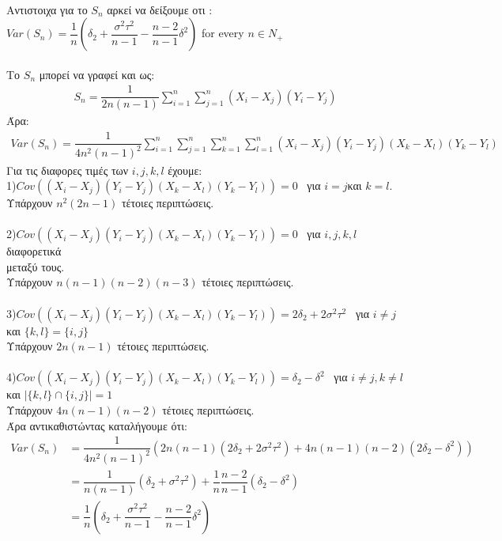 \documentclass{article}
\begin{document}
\paragraph{}
Αντιστοιχα για το $S_{n}$ αρκεί να δείξουμε οτι :\\
$Var(S_{n})=\dfrac{1}{n}(\delta_{2}+\dfrac{\sigma^{2}\tau^{2}}{n-1}-\dfrac{n-2}{n-1}\delta^{2})$ for every $ n\in N_{+}$ \\\\

Tο $S_{n}$ μπορεί να γραφεί και ως:
\begin{align*}
S_{n}=\dfrac{1}{2n(n-1)}\sum_{i=1}^{n}\sum_{j=1}^{n}(X_{i}-X_{j})(Y_{i}-Y_{j})
\end{align*}
Άρα:
\begin{align*}
Var(S_{n})=\dfrac{1}{4n^{2}(n-1)^{2}}\sum_{i=1}^{n}\sum_{j=1}^{n}\sum_{k=1}^{n}\sum_{l=1}^{n}(X_{i}-X_{j})(Y_{i}-Y_{j})(X_{k}-X_{l})(Y_{k}-Y_{l})
\end{align*}
Για τις διαφορες τιμές των $i,j,k,l$ έχουμε:\\
1)$Cov((X_{i}-X_{j})(Y_{i}-Y_{j})(X_{k}-X_{l})(Y_{k}-Y_{l}))=0$~ για $i=j$και $k=l$.
\\ Υπάρχουν $n^{2}(2n-1)$ τέτοιες περιπτώσεις.\\\\
2)$Cov((X_{i}-X_{j})(Y_{i}-Y_{j})(X_{k}-X_{l})(Y_{k}-Y_{l}))=0$~ για $i,j,k,l$ διαφορετικά\\ μεταξύ τους.
\\ Υπάρχουν $n(n-1)(n-2)(n-3)$ τέτοιες περιπτώσεις.\\\\
3)$Cov((X_{i}-X_{j})(Y_{i}-Y_{j})(X_{k}-X_{l})(Y_{k}-Y_{l}))=2\delta_{2}+2\sigma^{2}\tau^{2}$ ~για $i\neq j$ και $\lbrace k,l\rbrace=\lbrace i,j\rbrace$
\\ Υπάρχουν $2n(n-1)$ τέτοιες περιπτώσεις.\\\\
4)$Cov((X_{i}-X_{j})(Y_{i}-Y_{j})(X_{k}-X_{l})(Y_{k}-Y_{l}))=\delta_{2}-\delta^{2}$ ~για $i\neq j,k \neq l$ και $\vert\lbrace k,l\rbrace\cap\lbrace i,j\rbrace\vert=1$
\\ Υπάρχουν $4n(n-1)(n-2)$ τέτοιες περιπτώσεις.\\

Άρα αντικαθιστώντας καταλήγουμε ότι:
\begin{align*}
Var(S_{n}) &=\dfrac{1}{4n^{2}(n-1)^{2}}(2n(n-1)(2\delta_{2}+2\sigma^{2}\tau^{2})+4n(n-1)(n-2)(2\delta_{2}-\delta^{2})) \\
&=\dfrac{1}{n(n-1)}(\delta_{2}+\sigma^{2}\tau^{2})+\dfrac{1}{n}\dfrac{n-2}{n-1}(\delta_{2}-\delta^{2}) \\
&=\dfrac{1}{n}(\delta_{2}+\dfrac{\sigma^{2}\tau^{2}}{n-1}-\dfrac{n-2}{n-1}\delta^{2})
\end{align*}
\\
\end{document}
